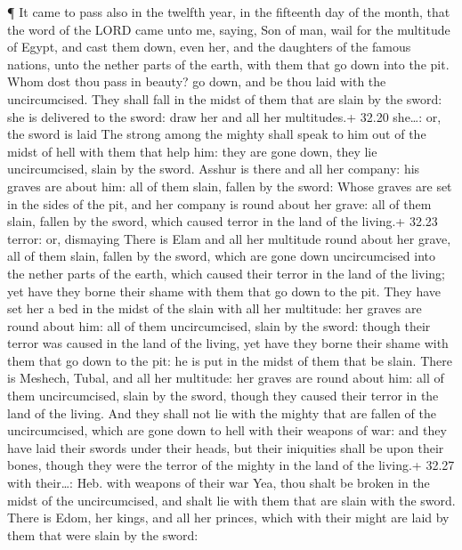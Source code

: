  ¶ It came to pass also in the twelfth year, in the
fifteenth day of the month, that the word of the LORD came unto me,
saying,  Son of man, wail for the multitude of Egypt, and
cast them down, even her, and the daughters of the famous nations, unto
the nether parts of the earth, with them that go down into the pit.
 Whom dost thou pass in beauty? go down, and be thou laid
with the uncircumcised.  They shall fall in the midst of
them that are slain by the sword: she is delivered to the sword: draw
her and all her multitudes.+ 32.20 she\ldots: or, the sword is laid
 The strong among the mighty shall speak to him out of the
midst of hell with them that help him: they are gone down, they lie
uncircumcised, slain by the sword.  Asshur is there and all
her company: his graves are about him: all of them slain, fallen by the
sword:  Whose graves are set in the sides of the pit, and
her company is round about her grave: all of them slain, fallen by the
sword, which caused terror in the land of the living.+ 32.23 terror: or,
dismaying  There is Elam and all her multitude round about
her grave, all of them slain, fallen by the sword, which are gone down
uncircumcised into the nether parts of the earth, which caused their
terror in the land of the living; yet have they borne their shame with
them that go down to the pit.  They have set her a bed in
the midst of the slain with all her multitude: her graves are round
about him: all of them uncircumcised, slain by the sword: though their
terror was caused in the land of the living, yet have they borne their
shame with them that go down to the pit: he is put in the midst of them
that be slain.  There is Meshech, Tubal, and all her
multitude: her graves are round about him: all of them uncircumcised,
slain by the sword, though they caused their terror in the land of the
living.  And they shall not lie with the mighty that are
fallen of the uncircumcised, which are gone down to hell with their
weapons of war: and they have laid their swords under their heads, but
their iniquities shall be upon their bones, though they were the terror
of the mighty in the land of the living.+ 32.27 with their\ldots: Heb.
with weapons of their war  Yea, thou shalt be broken in the
midst of the uncircumcised, and shalt lie with them that are slain with
the sword.  There is Edom, her kings, and all her princes,
which with their might are laid by them that were slain by the sword:
